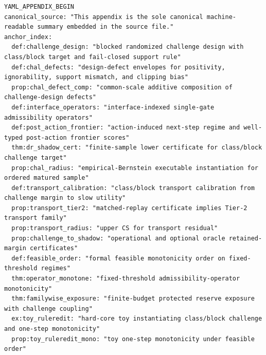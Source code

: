 \documentclass[11pt]{article}
\theoremstyle{definition}
\newcommand{\1}{\mathbf{1}}
\begin{document}
{\tiny
\begin{verbatim}
YAML_APPENDIX_BEGIN
canonical_source: "This appendix is the sole canonical machine-readable summary embedded in the source file."
anchor_index:
  def:challenge_design: "blocked randomized challenge design with class/block target and fail-closed support rule"
  def:chal_defects: "design-defect envelopes for positivity, ignorability, support mismatch, and clipping bias"
  prop:chal_defect_comp: "common-scale additive composition of challenge-design defects"
  def:interface_operators: "interface-indexed single-gate admissibility operators"
  def:post_action_frontier: "action-induced next-step regime and well-typed post-action frontier scores"
  thm:dr_shadow_cert: "finite-sample lower certificate for class/block challenge target"
  prop:chal_radius: "empirical-Bernstein executable instantiation for ordered matured sample"
  def:transport_calibration: "class/block transport calibration from challenge margin to slow utility"
  prop:transport_tier2: "matched-replay certificate implies Tier-2 transport family"
  prop:transport_radius: "upper CS for transport residual"
  prop:challenge_to_shadow: "operational and optional oracle retained-margin certificates"
  def:feasible_order: "formal feasible monotonicity order on fixed-threshold regimes"
  thm:operator_monotone: "fixed-threshold admissibility-operator monotonicity"
  thm:familywise_exposure: "finite-budget protected reserve exposure with challenge coupling"
  ex:toy_ruleredit: "hard-core toy instantiating class/block challenge and one-step monotonicity"
  prop:toy_ruleredit_mono: "toy one-step monotonicity under feasible order"


\end{verbatim}}
\end{document}

